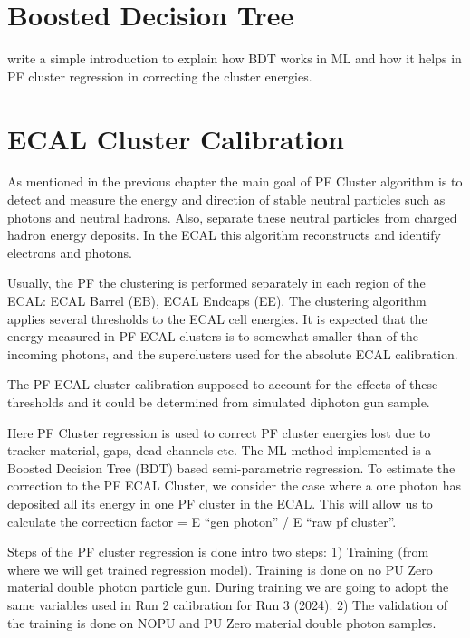 
\section{Boosted Decision Tree}
write a simple introduction to explain how BDT works in ML and how it helps in PF cluster regression in correcting the cluster energies. 
\section{ECAL Cluster Calibration}

As mentioned in the previous chapter the main goal of PF Cluster algorithm is to detect and measure the energy and direction of stable neutral particles such as photons and neutral hadrons. Also, separate these neutral particles from charged hadron energy deposits. In the ECAL this algorithm reconstructs and identify electrons and photons.  

Usually, the PF the clustering is performed separately in each region of the ECAL: ECAL Barrel (EB), ECAL Endcaps (EE). The clustering algorithm applies several thresholds to the ECAL cell energies. It is expected that the energy measured in PF ECAL clusters is to somewhat smaller than of the incoming photons, and the superclusters used for the absolute ECAL calibration. 

The PF ECAL cluster calibration supposed to account for the effects of these thresholds and it could be determined from simulated diphoton gun sample.  

Here PF Cluster regression is used to correct PF cluster energies lost due to tracker material, gaps, dead channels etc. The ML method implemented is a Boosted Decision Tree (BDT) based semi-parametric regression. To estimate the correction to the PF ECAL Cluster, we consider the case where a one photon has deposited all its energy in one PF cluster in the ECAL. This will allow us to calculate the correction factor = E “gen photon” / E “raw pf cluster”.  

Steps of the PF cluster regression is done intro two steps: 1) Training (from where we will get trained regression model). Training is done on no PU Zero material double photon particle gun. During training we are going to adopt the same variables used in Run 2 calibration for Run 3 (2024). 2) The validation of the training is done on NOPU and PU Zero material double photon samples.   

